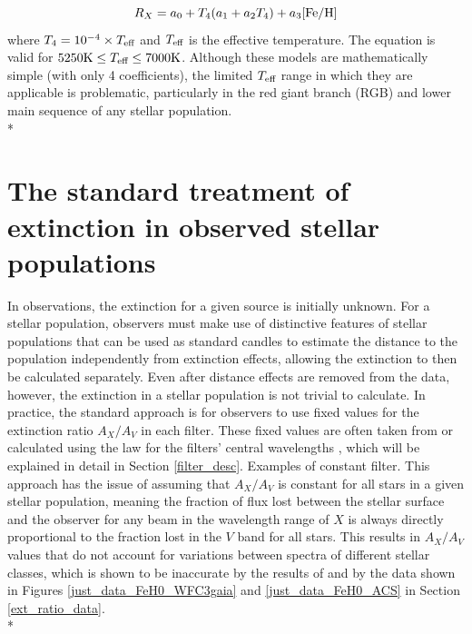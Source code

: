 \documentclass[12pt, a4paper]{report}
\begin{document}
\begin{equation}
R_{X} = a_{0} + T_{4}(a_{1} + a_{2}T_{4}) + a_{3}\textnormal{[Fe/H]}
\label{casagrande_ext_fit}
\end{equation}
where $T_{4} = 10^{-4} \times T_{\textnormal{eff}}$ and $T_{\textnormal{eff}}$ is the effective temperature. The equation is valid for $5250\textnormal{K} \leq T_{\textnormal{eff}} \leq 7000\textnormal{K}$. Although these models are mathematically simple (with only 4 coefficients), the limited $T_{\textnormal{eff}}$ range in which they are applicable is problematic, particularly in the red giant branch (RGB) and lower main sequence of any stellar population.\\*

\section{The standard treatment of extinction in observed stellar populations} \label{standard_ext}

In observations, the extinction for a given source is initially unknown. For a stellar population, observers must make use of distinctive features of stellar populations that can be used as standard candles to estimate the distance to the population independently from extinction effects, allowing the extinction to then be calculated separately. Even after distance effects are removed from the data, however, the extinction in a stellar population is not trivial to calculate. In practice, the standard approach is for observers to use fixed values for the extinction ratio $A_{X}/A_{V}$ in each filter. These fixed values are often taken from \cite{1985ApJ...288..618R} or calculated using the \cite{1989ApJ...345..245C} law for the filters' central wavelengths \citep{2018ApJ...868...25B,2020A&A...633A..38D}, which will be explained in detail in Section \ref{filter_desc}. Examples of constant filter. This approach has the issue of assuming that $A_{X}/A_{V}$ is constant for all stars in a given stellar population, meaning the fraction of flux lost between the stellar surface and the observer for any beam in the wavelength range of $X$ is always directly proportional to the fraction lost in the $V$ band for all stars. This results in  $A_{X}/A_{V}$ values that do not account for variations between spectra of different stellar classes, which is shown to be inaccurate by the results of \cite{2008PASP..120..583G} and by the data shown in Figures \ref{just_data_FeH0_WFC3gaia} and \ref{just_data_FeH0_ACS} in Section \ref{ext_ratio_data}.\\*
\end{document}
